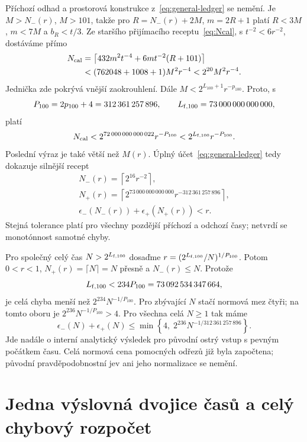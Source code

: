 \documentclass[11pt,a4paper]{article}
\theoremstyle{remark}\newtheorem{remark}[theorem]{Poznámka}
\numberwithin{equation}{section}
\begin{document}
Příchozí odhad a prostorová konstrukce z~\eqref{eq:general-ledger} se nemění. Je \(M>N_-(r)\), \(M>101\), takže pro
\(R=N_-(r)+2M\), \(m=2R+1\) platí \(R<3M\), \(m<7M\) a \(b_R<t/3\).
Ze staršího přijímacího receptu~\eqref{eq:Ncal}, s \(t^{-2}<6r^{-2}\), dostáváme přímo
\begin{align*}
N_{\rm cal}
&=\left\lceil432m^2t^{-4}+6mt^{-2}(R+101)\right\rceil\\
&<(762048+1008+1)M^2r^{-4}<2^{20}M^2r^{-4}.
\end{align*}
Jednička zde pokrývá vnější zaokrouhlení. Dále
\(M<2^{L_{100}+1}r^{-p_{100}}\). Proto, s
\[
P_{100}=2p_{100}+4=312\,361\,257\,896,\qquad
L_{{\rm f},100}=73\,000\,000\,000\,000,
\]
platí
\[
N_{\rm cal}<2^{72\,000\,000\,000\,022}r^{-P_{100}}
<2^{L_{{\rm f},100}}r^{-P_{100}}.
\]
Poslední výraz je také větší než \(M(r)\). Úplný účet~\eqref{eq:general-ledger} tedy dokazuje silnější recept
\begin{equation}
\boxed{\begin{gathered}
N_-(r)=\left\lceil2^{16}r^{-2}\right\rceil,\\
N_+(r)=\left\lceil2^{73\,000\,000\,000\,000}
r^{-312\,361\,257\,896}\right\rceil,\\
\epsilon_-(N_-(r))+\epsilon_+(N_+(r))<r.
\end{gathered}}
\label{eq:high100fullrecipe}
\end{equation}
Stejná tolerance platí pro všechny pozdější příchozí a odchozí časy; netvrdí se monotónnost samotné chyby.

Pro společný celý čas \(N>2^{L_{{\rm f},100}}\) dosaďme
\(r=(2^{L_{{\rm f},100}}/N)^{1/P_{100}}\).
Potom \(0<r<1\), \(N_+(r)=\lceil N\rceil=N\) přesně a \(N_-(r)\le N\).
Protože
\[
L_{{\rm f},100}<234P_{100}=73\,092\,534\,347\,664,
\]
je celá chyba menší než \(2^{234}N^{-1/P_{100}}\).
Pro zbývající \(N\) stačí normová mez čtyři; na tomto oboru je
\(2^{236}N^{-1/P_{100}}>4\). Pro všechna celá \(N\ge1\) tak máme
\begin{equation}
\boxed{\epsilon_-(N)+\epsilon_+(N)
\le\min\left\{4,\;2^{236}N^{-1/312\,361\,257\,896}\right\}.}
\label{eq:high100fullrate}
\end{equation}
Jde nadále o interní analytický výsledek pro původní ostrý vstup s pevným počátkem času. Celá normová cena pomocných odřezů již byla započtena; původní pravděpodobnostní jev ani jeho normalizace se nemění.

\section{Jedna výslovná dvojice časů a celý chybový rozpočet}
\label{sec:explicit-times}
\end{document}
